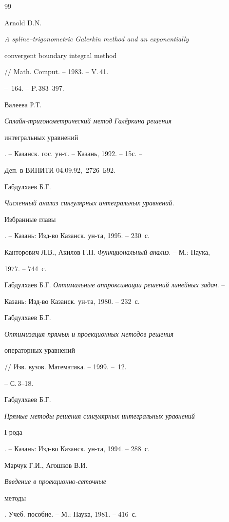 \begin{thebibliography}{99}







Arnold D.N. {\em A spline--trigonometric Galerkin method and an exponentially


convergent boundary integral method} // Math. Comput. -- 1983. -- V.\,41.


-- \No\,164. -- P.\,383--397.




Валеева Р.Т. {\em Сплайн-тригонометрический метод Гал\"еркина решения


интегральных уравнений}. -- Казанск. гос. ун-т. -- Казань, 1992. -- 15с. --


Деп. в ВИНИТИ 04.09.92, \No\,2726--Б92.




Габдулхаев Б.Г. {\em Численный анализ сингулярных интегральных уравнений.


Избранные главы}. -- Казань: Изд-во Казанск. ун-та, 1995. -- 230~с.




Канторович Л.В., Акилов Г.П. {\em Функциональный анализ}. -- М.: Наука,


1977. -- 744~с.




Габдулхаев Б.Г. {\em Оптимальные аппроксимации решений линейных задач}. --


Казань: Изд-во Казанск. ун-та, 1980. -- 232~с.




Габдулхаев Б.Г. {\em Оптимизация прямых и проекционных методов решения


операторных уравнений} // Изв. вузов. Математика. -- 1999. -- \No\,12.


-- С.\,3--18.




Габдулхаев Б.Г. {\em Прямые методы решения сингулярных интегральных уравнений


$\mathrm I$-рода}. -- Казань: Изд-во Казанск. ун-та, 1994. -- 288~с.




Марчук Г.И., Агошков В.И. {\em Введение в проекционно-сеточные


методы}. Учеб. пособие. -- М.: Наука, 1981. -- 416~с.





\end{thebibliography}
